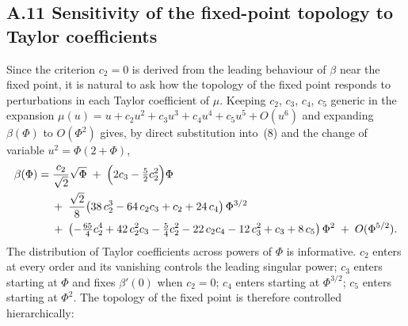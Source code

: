 
\subsection*{A.11 Sensitivity of the fixed-point topology to Taylor coefficients}
\label{app:sensitivity}

Since the criterion $c_2 = 0$ is derived from the leading behaviour of $\beta$
near the fixed point, it is natural to ask how the topology of the fixed
point responds to perturbations in each Taylor coefficient of $\mu$. Keeping
$c_2$, $c_3$, $c_4$, $c_5$ generic in the expansion $\mu(u) = u + c_2 u^2 +
c_3 u^3 + c_4 u^4 + c_5 u^5 + O(u^6)$ and expanding $\beta(\Phi)$ to
$O(\Phi^2)$ gives, by direct substitution into~(8) and the change of
variable $u^2 = \Phi(2+\Phi)$,
\begin{align}
\beta(\Phi) &= \frac{c_2}{\sqrt{2}}\sqrt{\Phi}
             \;+\; \Bigl(2c_3 - \tfrac{5}{2}c_2^2\Bigr)\Phi \notag \\
            &\quad\;+\; \frac{\sqrt{2}}{8}\bigl(38\,c_2^3 - 64\,c_2 c_3
                    + c_2 + 24\,c_4\bigr)\,\Phi^{3/2} \notag \\
            &\quad\;+\; \bigl(-\tfrac{65}{4}c_2^4 + 42\,c_2^2 c_3
                    - \tfrac{5}{4}c_2^2 - 22\,c_2 c_4
                    - 12\,c_3^2 + c_3 + 8\,c_5\bigr)\,\Phi^2
                    \;+\; O(\Phi^{5/2}).
\label{eq:full-expansion}
\end{align}
The distribution of Taylor coefficients across powers of $\Phi$ is
informative. $c_2$ enters at every order and its vanishing controls the
leading singular power; $c_3$ enters starting at $\Phi$ and fixes
$\beta'(0)$ when $c_2 = 0$; $c_4$ enters starting at $\Phi^{3/2}$;
$c_5$ enters starting at $\Phi^2$. The topology of the fixed point is
therefore controlled hierarchically:

